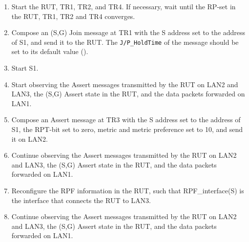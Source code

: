 \documentclass[11pt]{report}
\begin{document}
\begin{enumerate}

  \item Start the RUT, TR1, TR2, and TR4. If necessary, wait until the RP-set
  in the RUT, TR1, TR2 and TR4 converges.

  \item Compose an (S,G) Join message at TR1 with the S address set to the
  address of S1, and send it to the RUT.
  The \verb=J/P_HoldTime= of the message should be set to its default
  value ({\PimsmJPHoldTime}).

  \item Start S1.

  \item Start observing the Assert messages transmitted by the RUT on
  LAN2 and LAN3, the (S,G) Assert state in the RUT, and the data packets
  forwarded on LAN1.

  \item Compose an Assert message at TR3 with the S address set to the
  address of S1, the RPT-bit set to zero, metric and metric preference set to
  10, and send it on LAN2.

  \item Continue observing the Assert messages transmitted by the RUT on
  LAN2 and LAN3, the (S,G) Assert state in the RUT, and the data packets
  forwarded on LAN1.

  \item Reconfigure the RPF information in the RUT, such that
  RPF\_interface(S) is the interface that connects the RUT to LAN3.

  \item Continue observing the Assert messages transmitted by the RUT on
  LAN2 and LAN3, the (S,G) Assert state in the RUT, and the data packets
  forwarded on LAN1.

\end{enumerate}

\end{document}
